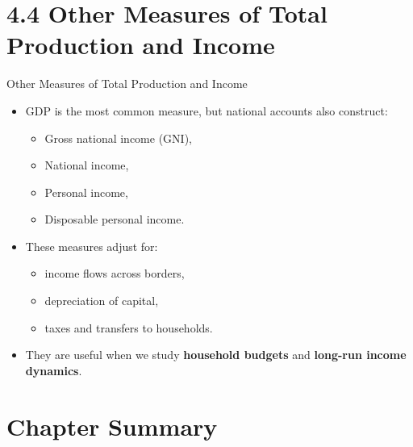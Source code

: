 \documentclass[aspectratio=169]{beamer}
\begin{document}
\section{4.4 Other Measures of Total Production and Income}

\begin{frame}{Other Measures of Total Production and Income}
\transfade
\begin{itemize}[<+->]
  \item GDP is the most common measure, but national accounts also construct:
  \begin{itemize}[<+->]
    \item Gross national income (GNI),
    \item National income,
    \item Personal income,
    \item Disposable personal income.
  \end{itemize}
  \item These measures adjust for:
  \begin{itemize}[<+->]
    \item income flows across borders,
    \item depreciation of capital,
    \item taxes and transfers to households.
  \end{itemize}
  \item They are useful when we study \textbf{household budgets} and \textbf{long-run income dynamics}.
\end{itemize}
\end{frame}

\section*{Chapter Summary}
\end{document}
